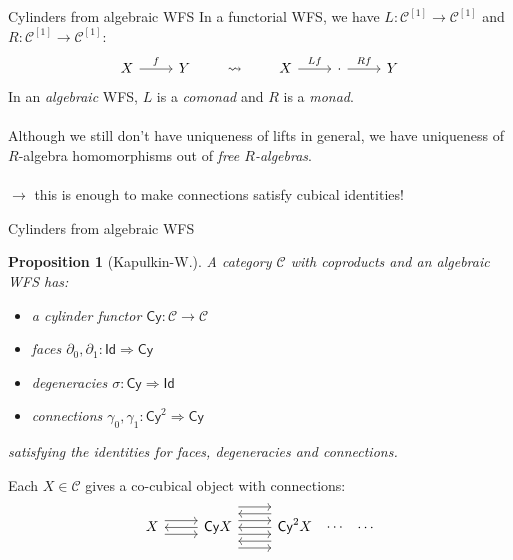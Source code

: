 \documentclass[compress]{beamer}
\newtheorem{proposition}[theorem]{Proposition}
\newcommand{\varcat}[1]{\mathcal{#1}}
\newcommand{\C}{\varcat{C}}
\newcommand{\To}{\Rightarrow}
\newcommand{\ii}{{\scriptscriptstyle [1]}}
\newcommand{\1}{\mathbf{1}}
\newcommand{\Id}{\mathsf{Id}}
\newcommand{\Cyl}{\mathsf{Cy}}
\begin{document}
\begin{frame}[fragile]{Cylinders from algebraic WFS}
	In a functorial WFS, we have $L \colon \C^\ii \to \C^\ii$ and $R \colon \C^\ii \to \C^\ii$:
	\[
		\begin{tikzcd}	
			X \ar[r, "f"] & Y
		\end{tikzcd}
		\quad \quad
		\rightsquigarrow
		\quad \quad
		\begin{tikzcd}
			X \ar[r, "Lf"] & \cdot \ar[r, "Rf"] & Y
		\end{tikzcd}
	\]
	\pause
	In an \emph{algebraic} WFS, $L$ is a \emph{comonad} and $R$ is a \emph{monad}. \\~\\
	\pause 
	Although we still don't have uniqueness of lifts in general, we have uniqueness of $R$-algebra homomorphisms out of \emph{free $R$-algebras}. \\~\\
	\pause
	$\to$ this is enough to make connections satisfy cubical identities!
\end{frame}

\begin{frame}[fragile]{Cylinders from algebraic WFS}
	\begin{proposition}[Kapulkin-W.]
		A category $\C$ with coproducts and an algebraic WFS has:
		\begin{itemize}
			\item a cylinder functor $\Cyl \colon \C \to \C$
			\item faces $\partial_0, \partial_1 \colon \Id \To \Cyl$ 
			\item degeneracies $\sigma \colon \Cyl \To \Id$ 
			\item connections $\gamma_0, \gamma_1 \colon \Cyl^2 \To \Cyl$
		\end{itemize}
		satisfying the identities for faces, degeneracies and connections.
	\end{proposition}
	\pause \vfill
	Each $X \in \C$ gives a co-cubical object with connections:
	\[
		\begin{tikzcd}
			X \ar[r, shift left = 2] \ar[r, shift right = 2] & \Cyl X \ar[l] \ar[r, shift left = 2] \ar[r, shift left = 6] \ar[r, shift right = 2] \ar[r, shift right = 6] & \Cyl^2 X \ar[l, shift left = 4] \ar[l] \ar[l, shift right = 4] \ar[r, phantom, "\cdots"] & \cdots
		\end{tikzcd}
	\]
\end{frame}
\end{document}
